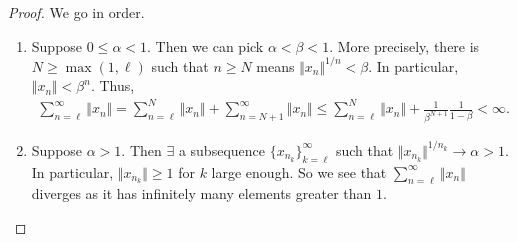 \documentclass{report}
\begin{document}
\begin{proof}
    We go in order.
    \begin{enumerate}
        \item Suppose $0 \leq \alpha < 1$. Then we can pick $\alpha < \beta < 1$. More precisely, there is $N \geq \max(1, \ell)$ such that $n \geq N$ means $\Vert x_n\Vert^{1/n} < \beta$. In particular, $\Vert x_n\Vert < \beta^n$. Thus,
        \begin{align}
            \sum_{n =\ell}^\infty \Vert x_n\Vert = \sum_{n=\ell}^N \Vert x_n\Vert + \sum_{n=N+1}^\infty \Vert x_n\Vert \leq \sum_{n=\ell}^N \Vert x_n\Vert + \frac{1}{\beta^{N+1}}\frac{1}{1-\beta} < \infty.
        \end{align}
        \item Suppose $\alpha > 1$. Then $\exists$ a subsequence $\{x_{n_k}\}_{k=\ell}^\infty$ such that $\Vert x_{n_{k}}\Vert^{1/n_k} \to \alpha > 1$. In particular, $\Vert x_{n_k}\Vert \geq 1$ for $k$ large enough. So we see that $\sum_{n=\ell}^\infty \Vert x_{n}\Vert$ diverges as it has infinitely many elements greater than $1$.
    \end{enumerate}
\end{proof}
\end{document}
